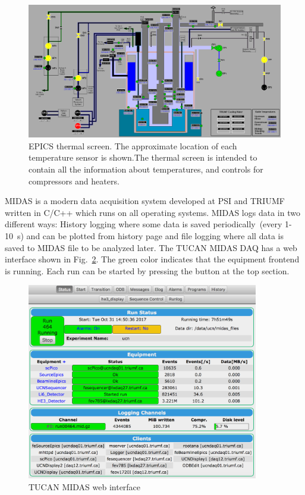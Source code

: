 \begin{figure}[h!]
  \centering
  \includegraphics[width=1.0\textwidth]{epics.png}
  \caption[TUCAN's EPICS thermal screen]{EPICS thermal screen. The
    approximate location of each temperature sensor is shown.The
    thermal screen is intended to contain all the information about
    temperatures, and controls for compressors and heaters. }
  \label{fig:epics}
\end{figure}

MIDAS is a modern data acquisition system developed at PSI and TRIUMF
written in C/C++ which runs on all operating systems. MIDAS logs data
in two different ways: History logging where some data is saved
periodically~(every 1-10~s) and can be plotted from history page and
file logging where all data is saved to MIDAS file to be analyzed
later. The TUCAN MIDAS DAQ has a web interface shown in
Fig.~\ref{fig:midas}. The green color indicates that the equipment
frontend is running. Each run can be started by pressing the button at
the top section.

\begin{figure}[h!]
  \centering
  \includegraphics[width=0.9\textwidth]{midas.png}
  \caption{TUCAN MIDAS web interface }
  \label{fig:midas}
\end{figure}


